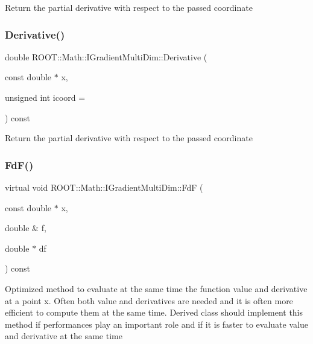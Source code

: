 Return the partial derivative with respect to the passed coordinate \mbox{\label{classROOT_1_1Math_1_1IGradientMultiDim_ae131d6cc942c8fcf90a3b575335b30a7}} 
\subsubsection{\texorpdfstring{Derivative()}{Derivative()}\hspace{0.1cm}{\footnotesize\ttfamily [3/3]}}
{\footnotesize\ttfamily double R\+O\+O\+T\+::\+Math\+::\+I\+Gradient\+Multi\+Dim\+::\+Derivative (\begin{DoxyParamCaption}\item[{const double $\ast$}]{x,  }\item[{unsigned int}]{icoord = {} }\end{DoxyParamCaption}) const\hspace{0.3cm}{\ttfamily [inline]}}

Return the partial derivative with respect to the passed coordinate \mbox{\label{classROOT_1_1Math_1_1IGradientMultiDim_ad8d0e31b786327014524483a708d8f82}} 
\subsubsection{\texorpdfstring{FdF()}{FdF()}\hspace{0.1cm}{\footnotesize\ttfamily [1/3]}}
{\footnotesize\ttfamily virtual void R\+O\+O\+T\+::\+Math\+::\+I\+Gradient\+Multi\+Dim\+::\+FdF (\begin{DoxyParamCaption}\item[{const double $\ast$}]{x,  }\item[{double \&}]{f,  }\item[{double $\ast$}]{df }\end{DoxyParamCaption}) const\hspace{0.3cm}{\ttfamily [pure virtual]}}

Optimized method to evaluate at the same time the function value and derivative at a point x. Often both value and derivatives are needed and it is often more efficient to compute them at the same time. Derived class should implement this method if performances play an important role and if it is faster to evaluate value and derivative at the same time 

